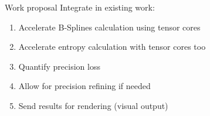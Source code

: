\begin{frame}{Work proposal}
	Integrate in existing work:
	
	\begin{enumerate}
		\item Accelerate B-Splines calculation using tensor cores
		\item Accelerate entropy calculation with tensor cores too
		\item Quantify precision loss
		\item Allow for precision refining if needed
		\item Send results for rendering (visual output)
	\end{enumerate}
\end{frame}